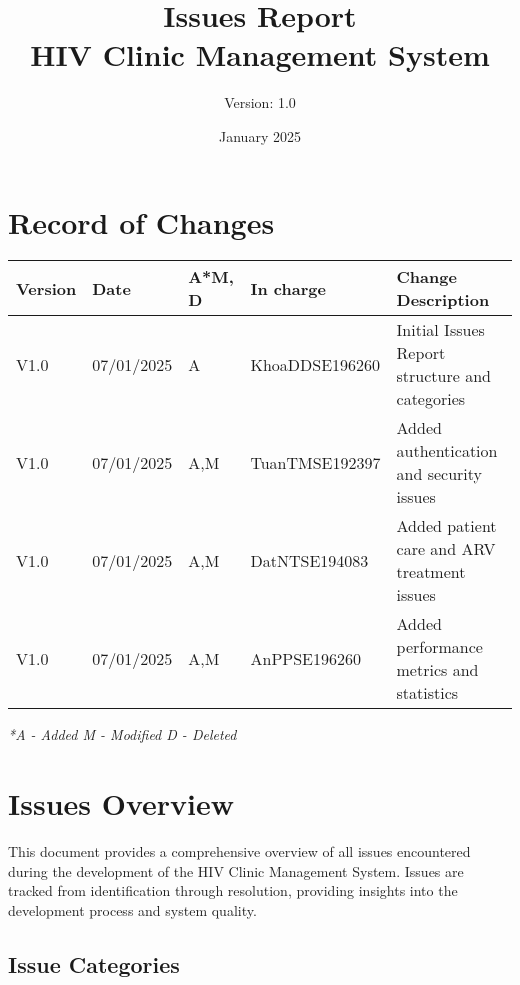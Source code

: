 \documentclass[12pt,a4paper]{article}
\title{\textbf{Issues Report\\HIV Clinic Management System}}
\author{Version: 1.0}
\date{January 2025}
\begin{document}
\maketitle
\thispagestyle{empty}

\newpage

\section*{Record of Changes}

\begin{longtable}{|p{1.5cm}|p{1.8cm}|p{1cm}|p{2.5cm}|p{5.5cm}|}
\hline
\textbf{Version} & \textbf{Date} & \textbf{A*M, D} & \textbf{In charge} & \textbf{Change Description} \\
\hline
V1.0 & 07/01/2025 & A & KhoaDDSE196260 & Initial Issues Report structure and categories \\
\hline
V1.0 & 07/01/2025 & A,M & TuanTMSE192397 & Added authentication and security issues \\
\hline
V1.0 & 07/01/2025 & A,M & DatNTSE194083 & Added patient care and ARV treatment issues \\
\hline
V1.0 & 07/01/2025 & A,M & AnPPSE196260 & Added performance metrics and statistics \\
\hline
\end{longtable}

\textit{*A - Added M - Modified D - Deleted}

\newpage

\tableofcontents

\newpage

\section{Issues Overview}

This document provides a comprehensive overview of all issues encountered during the development of the HIV Clinic Management System. Issues are tracked from identification through resolution, providing insights into the development process and system quality.

\subsection{Issue Categories}
\end{document}
